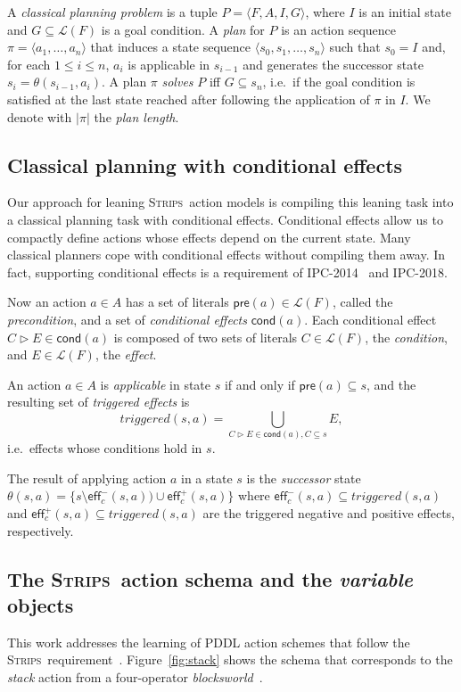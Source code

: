 \documentclass[letterpaper]{article} %
\newcommand{\tup}[1]{{\langle #1 \rangle}}
\newcommand{\pre}{\mathsf{pre}}     %
\newcommand{\eff}{\mathsf{eff}}     %
\newcommand{\cond}{\mathsf{cond}}   %
\newcommand{\strips}{\textsc{Strips}}     %
\begin{document}
A {\em classical planning problem} is a tuple $P=\tup{F,A,I,G}$, where $I$ is an initial state and $G\subseteq\mathcal{L}(F)$ is a goal condition. A {\em plan} for $P$ is an action sequence $\pi=\tup{a_1, \ldots, a_n}$ that induces a state sequence $\tup{s_0, s_1, \ldots, s_n}$ such that $s_0=I$ and, for each {\small $1\leq i\leq n$}, $a_i$ is applicable in $s_{i-1}$ and generates the successor state $s_i=\theta(s_{i-1},a_i)$. A plan $\pi$ {\em solves} $P$ iff $G\subseteq s_n$, i.e.~if the goal condition is satisfied at the last state reached after following the application of $\pi$ in $I$. We denote with $|\pi|$ the {\em plan length}.


\subsection{Classical planning with conditional effects}
Our approach for leaning \strips\ action models is compiling this leaning task into a classical planning task with conditional effects. Conditional effects allow us to compactly define actions whose effects depend on the current state. Many classical planners cope with conditional effects without compiling them away. In fact, supporting conditional effects is a requirement of IPC-2014~\cite{vallati:IPC:AIM2015} and IPC-2018.

Now an action $a\in A$ has a set of literals $\pre(a)\in\mathcal{L}(F)$, called the {\em precondition}, and a set of {\em conditional effects} $\cond(a)$. Each conditional effect $C\rhd E\in\cond(a)$ is composed of two sets of literals $C\in\mathcal{L}(F)$, the {\em condition}, and $E\in\mathcal{L}(F)$, the {\em effect}.

An action $a\in A$ is {\em applicable} in state $s$ if and only if $\pre(a)\subseteq s$, and the resulting set of {\em triggered effects} is
\[
triggered(s,a)=\bigcup_{C\rhd E\in\cond(a),C\subseteq s} E,
\]
i.e.~effects whose conditions hold in $s$.

The result of applying action $a$ in a state $s$ is the {\em successor} state $\theta(s,a)=\{s\setminus\eff_c^-(s,a))\cup\eff_c^+(s,a)\}$ where $\eff_c^-(s,a)\subseteq triggered(s,a)$ and $\eff_c^+(s,a)\subseteq triggered(s,a)$ are the triggered negative and positive effects, respectively.


\subsection{The \strips\ action schema and the {\em variable} objects}
This work addresses the learning of PDDL action schemes that follow the \strips\ requirement~\cite{mcdermott1998pddl,fox2003pddl2}. Figure~\ref{fig:stack} shows the schema that corresponds to the {\em stack} action from a four-operator {\em blocksworld}~\cite{slaney2001blocks}.
\end{document}
